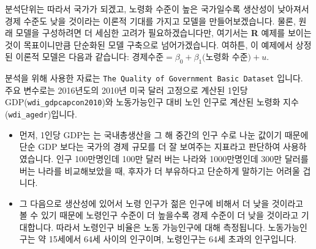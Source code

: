 \documentclass[
]{book}
\begin{document}
분석단위는 따라서 국가가 되겠고, 노령화 수준이 높은 국가일수록 생산성이 낮아져서 경제 수준도 낮을 것이라는 이론적 기대를 가지고 모델을 만들어보겠습니다. 물론, 원래 모델을 구성하려면 더 세심한 고려가 필요하겠습니다만, 여기서는 \textbf{R} 예제를 보이는 것이 목표이니만큼 단순화된 모델 구축으로 넘어가겠습니다. 여하튼, 이 예제에서 상정된 이론적 모델은 다음과 같습니다: \(\text{경제수준} = \beta_0 + \beta_1\text{(노령화 수준)} + u\).

분석을 위해 사용한 자료는 \texttt{The\ Quality\ of\ Government\ Basic\ Dataset} 입니다. 주요 변수로는 2016년도의 2010년 미국 달러 고정으로 계산된 1인당 GDP(\texttt{wdi\_gdpcapcon2010})와 노동가능인구 대비 노인 인구로 계산된 노령화 지수(\texttt{wdi\_agedr})입니다.

\begin{itemize}
\item
  먼저, 1인당 GDP는 는 국내총생산을 그 해 중간의 인구 수로 나눈 값이기 때문에 단순 GDP 보다는 국가의 경제 규모를 더 잘 보여주는 지표라고 판단하여 사용하였습니다. 인구 100만명인데 100만 달러 버는 나라와 1000만명인데 300만 달러를 버는 나라를 비교해보았을 때, 후자가 더 부유하다고 단순하게 말하기는 어려울 겁니다.
\item
  그 다음으로 생산성에 있어서 노령 인구가 젊은 인구에 비해서 더 낮을 것이라고 볼 수 있기 때문에 노령인구 수준이 더 높을수록 경제 수준이 더 낮을 것이라고 기대합니다. 따라서 노령인구 비율은 노동 가능인구에 대해 측정됩니다. 노동가능인구는 약 15세에서 64세 사이의 인구이며, 노령인구는 64세 초과의 인구입니다.
\end{itemize}
\end{document}
